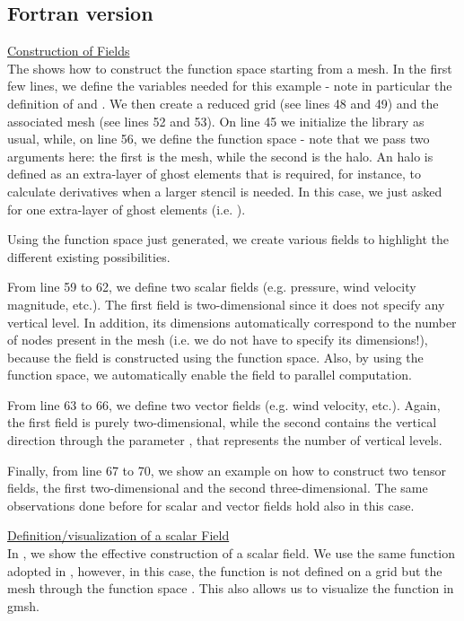 \subsection{Fortran version}
%
\begin{description}
%
\item \underline{Construction of Fields}\\[0.5em]
%
The  shows how to construct the function space 
 starting from a mesh. In the first few lines, we define 
the variables needed for this example - note in particular the definition 
of  and .
We then create a reduced grid (see lines 48 and 49) and the associated 
mesh (see lines 52 and 53).
On line 45 we initialize the library as usual, while, on line 56, 
we define the  function space - note that we pass two 
arguments here: the first is the mesh, while the second is the halo. 
An halo is defined as an extra-layer of ghost elements that is required, 
for instance, to calculate derivatives when a larger stencil is needed. 
In this case, we just asked for one extra-layer of ghost elements (i.e. 
). 

Using the function space  just generated, we create 
various fields to highlight the different existing possibilities.

From line 59 to 62, we define two scalar fields (e.g. pressure, 
wind velocity magnitude, etc.). The first field is two-dimensional 
since it does not specify any vertical level. In addition, its 
dimensions automatically correspond to the number of nodes present 
in the mesh (i.e. we do not have to specify its dimensions!), because 
the field is constructed using the function space. Also, by using the 
function space, we automatically enable the field to parallel computation.

From line 63 to 66,  we define two vector fields (e.g. wind 
velocity, etc.). Again, the first field is purely two-dimensional, 
while the second contains the vertical direction through the parameter 
, that represents the number of vertical levels. 

Finally, from line 67 to 70, we show an example on how to construct 
two tensor fields, the first two-dimensional and the second three-dimensional. 
The same observations done before for scalar and vector fields hold 
also in this case.
%

%
%
\item \underline{Definition/visualization of a scalar Field}\\[0.5em]
%
%
In , we show the effective construction 
of a scalar field. We use the same function adopted in , 
however, in this case, the function is not defined on a grid but 
the mesh through the function space . This also allows 
us to visualize the function in gmsh.


\end{description}
